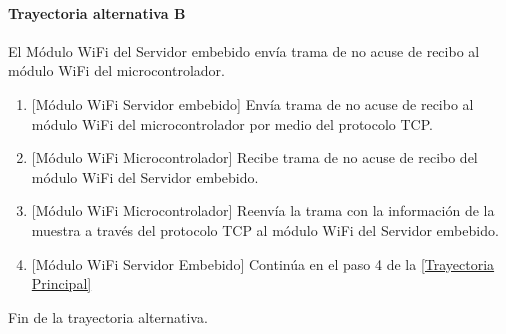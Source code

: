 \paragraph{Trayectoria alternativa B} \label{SUB-M-CU1.4:TB}
	El Módulo WiFi del Servidor embebido envía trama de no acuse de recibo al módulo WiFi del microcontrolador.
	\begin{enumerate}[label=B\arabic*.]
		\item {[Módulo WiFi Servidor embebido]} Envía trama de no acuse de recibo al módulo WiFi del microcontrolador por medio del protocolo TCP.
		\item {[Módulo WiFi Microcontrolador]} Recibe trama de no acuse de recibo del módulo WiFi del Servidor embebido.
		\item {[Módulo WiFi Microcontrolador]} Reenvía la trama con la información de la muestra a través del protocolo TCP al módulo WiFi del Servidor embebido.
		\item {[Módulo WiFi Servidor Embebido]} Continúa en el paso 4 de la \hyperref[SUB-M-CU1.4:TP]{[Trayectoria Principal]}
	\end{enumerate}
	Fin de la trayectoria alternativa.